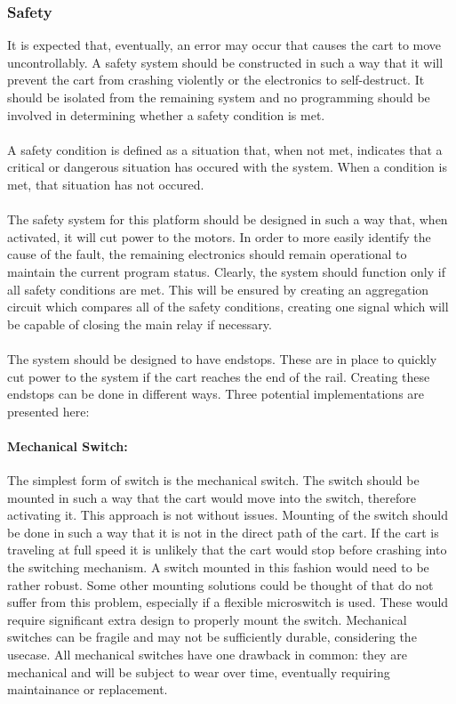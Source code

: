 \subsubsection{Safety} %
\label{subsub:safety}
It is expected that, eventually, an error may occur that causes the cart to move uncontrollably.
A safety system should be constructed in such a way that it will prevent the cart from crashing violently or the electronics to self-destruct.
It should be isolated from the remaining system and no programming should be involved in determining whether a safety condition is met.
\\~\\
A safety condition is defined as a situation that, when not met, indicates that a critical or dangerous situation has occured with the system.
When a condition is met, that situation has not occured.
\\~\\
The safety system for this platform should be designed in such a way that, when activated, it will cut power to the motors.
In order to more easily identify the cause of the fault, the remaining electronics should remain operational to maintain the current program status.
Clearly, the system should function only if all safety conditions are met.
This will be ensured by creating an aggregation circuit which compares all of the safety conditions, creating one signal which will be capable of closing the main relay if necessary.
\\~\\
The system should be designed to have endstops.
These are in place to quickly cut power to the system if the cart reaches the end of the rail.
Creating these endstops can be done in different ways.
Three potential implementations are presented here:
\paragraph{Mechanical Switch:} %
\label{par:mechanical_switch}
The simplest form of switch is the mechanical switch.
The switch should be mounted in such a way that the cart would move into the switch, therefore activating it.
This approach is not without issues.
Mounting of the switch should be done in such a way that it is not in the direct path of the cart.
If the cart is traveling at full speed it is unlikely that the cart would stop before crashing into the switching mechanism.
A switch mounted in this fashion would need to be rather robust.
Some other mounting solutions could be thought of that do not suffer from this problem, especially if a flexible microswitch is used.
These would require significant extra design to properly mount the switch.
Mechanical switches can be fragile and may not be sufficiently durable, considering the usecase.
All mechanical switches have one drawback in common: they are mechanical and will be subject to wear over time, eventually requiring maintainance or replacement.

